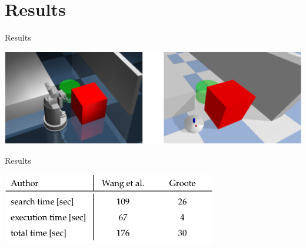 \section{Results}
\begin{frame}[fragile]{Results} 
\begin{center}
 \includegraphics[width=1.1\textwidth]{figures/results/compare_sota}
\end{center}
\end{frame}


\begin{frame}[fragile]{Results} 
\begin{center}
 \includegraphics[width=0.7\textwidth]{figures/results/table_sota}
\end{center}
\end{frame}



